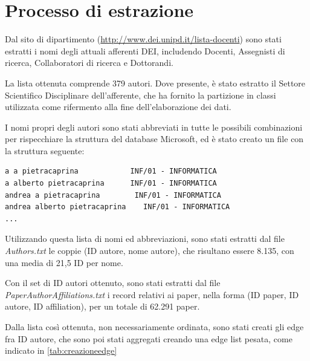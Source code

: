 \documentclass[12pt,a4paper,twoside]{report}
\begin{document}
\section{Processo di estrazione} \label{sec:processo}

Dal sito di dipartimento (\url{http://www.dei.unipd.it/lista-docenti}) sono stati estratti i nomi
degli attuali afferenti DEI, includendo Docenti, Assegnisti di ricerca, Collaboratori di ricerca e
Dottorandi.

La lista ottenuta comprende 379 autori.
Dove presente, è stato estratto il Settore Scientifico Disciplinare dell'afferente, che ha fornito
la partizione in classi utilizzata come rifermento alla fine dell'elaborazione dei dati.

I nomi propri degli autori sono stati abbreviati in tutte le possibili combinazioni per rispecchiare
la struttura del database Microsoft, ed è stato creato un file con la struttura seguente:

\begin{center}
\begin{minipage}{0.90\textwidth}
\begin{verbatim}
a a pietracaprina            INF/01 - INFORMATICA
a alberto pietracaprina	     INF/01 - INFORMATICA
andrea a pietracaprina	      INF/01 - INFORMATICA
andrea alberto pietracaprina	INF/01 - INFORMATICA
...

\end{verbatim}
\end{minipage}
\end{center}

Utilizzando questa lista di nomi ed abbreviazioni, sono stati estratti dal file \textit{Authors.txt}
le coppie (ID autore, nome autore), che risultano essere 8.135, con una media di 21,5 ID per nome.

Con il set di ID autori ottenuto, sono stati estratti dal file \textit{PaperAuthorAffiliations.txt}
i record relativi ai paper, nella forma (ID paper, ID autore, ID affiliation), per un totale di
62.291 paper.

Dalla lista così ottenuta, non necessariamente ordinata, sono stati creati gli edge fra ID autore,
che sono poi stati aggregati creando una edge list pesata, come indicato in \ref{tab:creazioneedge}
\end{document}
